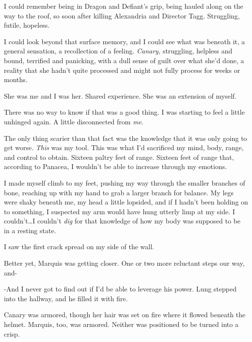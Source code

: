 I could remember being in Dragon and Defiant's grip, being hauled along on the way to the roof, so soon after killing Alexandria and Director Tagg.  Struggling, futile, hopeless.



I could look beyond that surface memory, and I could see what was beneath it, a general sensation, a recollection of a feeling.  \emph{Canary, }struggling, helpless and bound, terrified and panicking, with a dull sense of guilt over what she'd done, a reality that she hadn't quite processed and might not fully process for weeks or months.



She was me and I was her.  Shared experience.  She was an extension of myself.



There was no way to know if that was a good thing.  I was starting to feel a little unhinged again.  A little disconnected from \emph{me}.



The only thing scarier than that fact was the knowledge that it was only going to get worse.  \emph{This} was my tool.  This was what I'd sacrificed my mind, body, range, and control to obtain.  Sixteen paltry feet of range.  Sixteen feet of range that, according to Panacea, I wouldn't be able to increase through my emotions.



I made myself climb to my feet, pushing my way through the smaller branches of bone, reaching up with my hand to grab a larger branch for balance.  My legs were shaky beneath me, my head a little lopsided, and if I hadn't been holding on to something, I suspected my arm would have hung utterly limp at my side.  I couldn't\ldots I couldn't \emph{dig} for that knowledge of how my body was supposed to be in a resting state.



I saw the first crack spread on my side of the wall.



Better yet, Marquis was getting closer.  One or two more reluctant steps our way, and-



-And I never got to find out if I'd be able to leverage his power.  Lung stepped into the hallway, and he filled it with fire.



Canary was armored, though her hair was set on fire where it flowed beneath the helmet.  Marquis, too, was armored.  Neither was positioned to be turned into a crisp.



